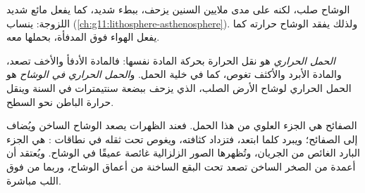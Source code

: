 الوشاح صلب، لكنه على مدى ملايين السنين يزحف، ببطء شديد، كما
يفعل مائع شديد اللزوجة:  ينساب (\cref{ch:g11:lithosphere-asthenosphere}).
ولذلك يفقد الوشاح حرارته كما يفعل الهواء فوق المدفأة، بحملها معه.

\begin{definition}\label{def:g12:internal-heat:convection}
\emph{الحمل الحراري} هو نقل الحرارة
بحركة المادة نفسها: فالمادة الأدفأ والأخف تصعد،
والمادة الأبرد والأكثف تغوص، كما في خلية الحمل.
و\emph{الحمل الحراري في الوشاح} هو الحمل
الحراري لوشاح الأرض الصلب، الذي يزحف ببضعة سنتيمترات في
السنة وينقل حرارة الباطن نحو السطح.
\end{definition}

الصفائح هي الجزء العلوي من هذا الحمل. فعند الظهرات يصعد الوشاح الساخن
ويُضاف إلى الصفائح؛ ويبرد  كلما ابتعد،
فتزداد كثافته، ويغوص تحت ثقله في نطاقات : 
هي الجزء البارد الغائص من الجريان، وتُظهرها الصور الزلزالية
غائصة عميقًا في الوشاح. ويُعتقد أن أعمدة من الصخر الساخن تصعد تحت
البقع الساخنة من أعماق الوشاح، وربما من فوق اللب مباشرة.

